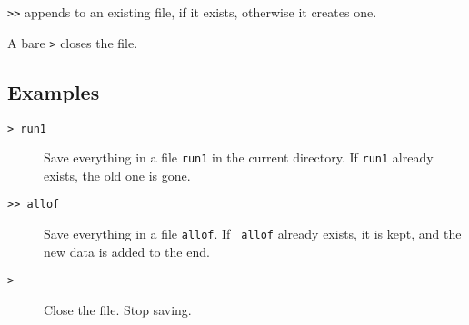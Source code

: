 {\tt >>} appends to an existing file, if it exists, otherwise it creates one.

A bare {\tt >} closes the file.
\subsection{Examples}

\begin{description}

\item[{\tt > run1}] Save everything in a file {\tt run1} in the current
directory.  If {\tt run1} already exists, the old one is gone.

\item[{\tt >> allof}] Save everything in a file {\tt allof}.  If {\tt
allof} already exists, it is kept, and the new data is added to the end.

\item[{\tt >}] Close the file.  Stop saving.

\end{description}
